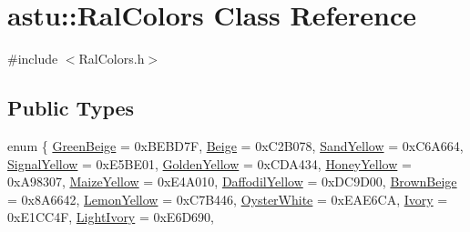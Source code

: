 \hypertarget{classastu_1_1RalColors}{}\section{astu\+:\+:Ral\+Colors Class Reference}
\label{classastu_1_1RalColors}


{\ttfamily \#include $<$Ral\+Colors.\+h$>$}

\subsection*{Public Types}
\begin{DoxyCompactItemize}
\item 
enum \{ \newline
\hyperlink{classastu_1_1RalColors_a18ad55749e0733dc1a412a97b7e40034a2adb0574db534d6445ad8551bf974f0d}{Green\+Beige} = 0x\+B\+E\+B\+D7F, 
\hyperlink{classastu_1_1RalColors_a18ad55749e0733dc1a412a97b7e40034a44e1b311a0e83cab4fe3c4c5be87caf8}{Beige} = 0x\+C2\+B078, 
\hyperlink{classastu_1_1RalColors_a18ad55749e0733dc1a412a97b7e40034ae48f1b3e29cea05efa9c4110ba0663b0}{Sand\+Yellow} = 0x\+C6\+A664, 
\hyperlink{classastu_1_1RalColors_a18ad55749e0733dc1a412a97b7e40034a5de0893a9180b89d2ddb6de3e1e53e75}{Signal\+Yellow} = 0x\+E5\+B\+E01, 
\newline
\hyperlink{classastu_1_1RalColors_a18ad55749e0733dc1a412a97b7e40034a577b6801f0871e6fa21f72dfeeefe3a2}{Golden\+Yellow} = 0x\+C\+D\+A434, 
\hyperlink{classastu_1_1RalColors_a18ad55749e0733dc1a412a97b7e40034ad174240b2546001db4ddbdf78c77fb0a}{Honey\+Yellow} = 0x\+A98307, 
\hyperlink{classastu_1_1RalColors_a18ad55749e0733dc1a412a97b7e40034a28a3c087ae689142cb8f2490f5bc23a8}{Maize\+Yellow} = 0x\+E4\+A010, 
\hyperlink{classastu_1_1RalColors_a18ad55749e0733dc1a412a97b7e40034a0f440e7f863ce4426e3041342e163ae4}{Daffodil\+Yellow} = 0x\+D\+C9\+D00, 
\newline
\hyperlink{classastu_1_1RalColors_a18ad55749e0733dc1a412a97b7e40034ac83033249d818ff1f60bd230ec0130ee}{Brown\+Beige} = 0x8\+A6642, 
\hyperlink{classastu_1_1RalColors_a18ad55749e0733dc1a412a97b7e40034a8e91a38ba0a3c2f2ee9a3505745fcccb}{Lemon\+Yellow} = 0x\+C7\+B446, 
\hyperlink{classastu_1_1RalColors_a18ad55749e0733dc1a412a97b7e40034a27fbc42a26d79818176db5c0793a60bd}{Oyster\+White} = 0x\+E\+A\+E6\+CA, 
\hyperlink{classastu_1_1RalColors_a18ad55749e0733dc1a412a97b7e40034ae5dee78512bed4b804da66057ebd2927}{Ivory} = 0x\+E1\+C\+C4F, 
\newline
\hyperlink{classastu_1_1RalColors_a18ad55749e0733dc1a412a97b7e40034ae2080c8e29693c4579467d2359881c62}{Light\+Ivory} = 0x\+E6\+D690, 

\end{DoxyCompactItemize}
